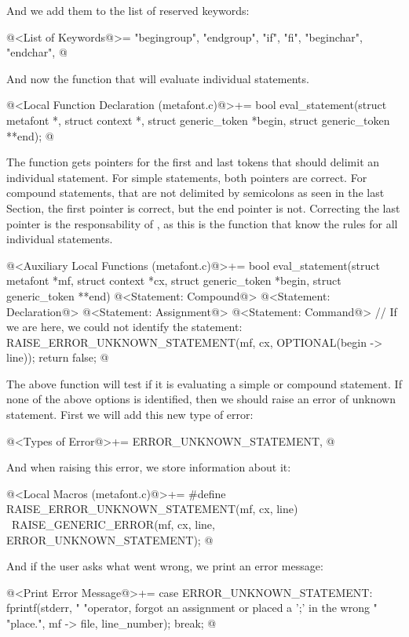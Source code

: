 And we add them to the list of reserved keywords:

\iniciocodigo
@<List of Keywords@>=
"begingroup", "endgroup", "if", "fi", "beginchar", "endchar",
@
\fimcodigo

And now the function that will evaluate individual statements.

\iniciocodigo
@<Local Function Declaration (metafont.c)@>+=
bool eval_statement(struct metafont *, struct context *,
                    struct generic_token *begin, struct generic_token **end);
@
\fimcodigo

The function gets pointers for the first and last tokens that should
delimit an individual statement. For simple statements, both pointers
are correct. For compound statements, that are not delimited by
semicolons as seen in the last Section, the first pointer is correct,
but the end pointer is not. Correcting the last pointer is the
responsability of , as this is the
function that know the rules for all individual statements.

\iniciocodigo
@<Auxiliary Local Functions (metafont.c)@>+=
bool eval_statement(struct metafont *mf, struct context *cx,
                    struct generic_token *begin, struct generic_token **end){
  @<Statement: Compound@>
  @<Statement: Declaration@>
  @<Statement: Assignment@>
  @<Statement: Command@>
  // If we are here, we could not identify the statement:
  RAISE_ERROR_UNKNOWN_STATEMENT(mf, cx, OPTIONAL(begin -> line));
  return false;
}
@
\fimcodigo

The above function will test if it is evaluating a simple or compound
statement. If none of the above options is identified, then we should
raise an error of unknown statement. First we will add this new type
of error:

\iniciocodigo
@<Types of Error@>+=
ERROR_UNKNOWN_STATEMENT,
@
\fimcodigo

And when raising this error, we store information about it:

\iniciocodigo
@<Local Macros (metafont.c)@>+=
#define RAISE_ERROR_UNKNOWN_STATEMENT(mf, cx, line) {\
  RAISE_GENERIC_ERROR(mf, cx, line, ERROR_UNKNOWN_STATEMENT);}
@
\fimcodigo

And if the user asks what went wrong, we print an error message:

\iniciocodigo
@<Print Error Message@>+=
case ERROR_UNKNOWN_STATEMENT:
  fprintf(stderr, "%
          "operator, forgot an assignment or placed a ';' in the wrong "
          "place.", mf -> file, line_number);
  break;
@
\fimcodigo

